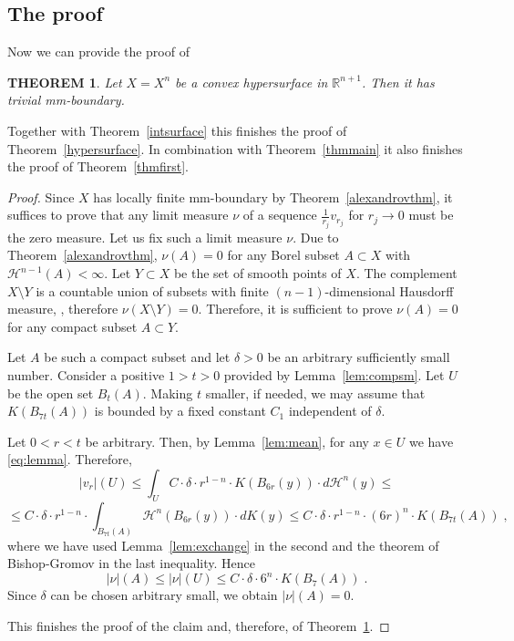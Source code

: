 \documentclass[12pt,leqno]{amsart}
\numberwithin{equation}{section}
\newtheorem{thm}{THEOREM}[section]
\theoremstyle{definition}
\theoremstyle{remark}
\newcommand{\tref}[1]{Theorem~\ref{#1}}
\newcommand{\lref}[1]{Lemma~\ref{#1}}
\newcommand{\R}{\mathbb{R}}
\begin{document}
\subsection{The proof} Now we can provide the proof of
\begin{thm} \label{thmconv}
Let $X=X^n$ be a convex hypersurface in $\R^{n+1}$.  Then it has trivial mm-boundary.

\end{thm}
Together with \tref{intsurface} this finishes the proof of \tref{hypersurface}. In combination with \tref{thmmain} it also finishes the proof of \tref{thmfirst}.
\begin{proof}
 Since $X$ has locally finite mm-boundary by
\tref{alexandrovthm}, it suffices to prove that  any limit measure $\nu$ of a sequence $\frac 1 {r_j} v_{r_j}$ for $r_j\to 0$ must be the zero measure.
Let us fix such a limit measure $\nu$.  Due to \tref{alexandrovthm}, $\nu (A)=0$ for any Borel subset $A\subset X$ with $\mathcal H^{n-1} (A)<\infty$.
Let $Y\subset X$ be the set of smooth points of $X$.
The complement $X\setminus Y$ is a countable union of subsets with finite $(n-1)$-dimensional Hausdorff measure, \cite[Theorem 1.4]{Schneider}, therefore $\nu (X\setminus Y) =0$.   Therefore, it is sufficient to prove $\nu (A)=0$
for any compact subset $A\subset Y$.



Let $A$ be such a compact subset and  let $\delta>0$ be an arbitrary sufficiently small number. Consider a positive $1>t>0$ provided by \lref{lem:compsm}.  Let $U$ be the open set $B_t (A)$. Making $t$ smaller, if needed, we may assume that $K(B_{7t}(A))$ is bounded by a
 fixed constant $C_1$ independent of $\delta$.

 Let $0<r<t$ be arbitrary. Then, by \lref{lem:mean},  for any $x\in U$ we have \eqref{eq:lemma}.
Therefore, $$|v_r| (U)\leq \int _U   C\cdot \delta \cdot r^{1-n}\cdot  K (B_{6r} (y)) \cdot d\mathcal H^n (y) \leq  $$
 $$\leq C\cdot \delta \cdot  r^{1-n} \cdot \int _{B_{7t} (A)} \mathcal H^n (B_{6r} (y)) \cdot dK(y)  \leq C\cdot \delta \cdot  r^{1-n} \cdot (6r) ^n \cdot K(B_{7t} (A)) \;,  $$
where we have used \lref{lem:exchange} in the second and the theorem of Bishop-Gromov in the last inequality.  Hence
$$|\nu| (A) \leq |\nu| (U) \leq C\cdot \delta \cdot 6^n \cdot K(B_7 (A)) \;. $$
Since $\delta$ can be chosen arbitrary small, we obtain $|\nu| (A)=0$.

This finishes the proof of the claim and, therefore, of \tref{thmconv}.
\end{proof}
\end{document}
